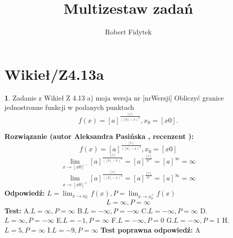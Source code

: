 \documentclass[12pt, a4paper]{article}
\title{Multizestaw zadań}
\author{Robert Fidytek}
\date{}
\theoremstyle{definition} %
\newtheorem{zad}{}
\newcommand{\kategoria}[1]{\section{#1}} %
\newcommand{\zadStart}[1]{\begin{zad}#1\newline} %
\newcommand{\zadStop}{\end{zad}}   %
\newcommand{\rozwStart}[2]{\noindent \textbf{Rozwiązanie (autor #1 , recenzent #2): }\newline} %
\newcommand{\rozwStop}{\newline}                                            %
\newcommand{\odpStart}{\noindent \textbf{Odpowiedź:}\newline}    %
\newcommand{\odpStop}{\newline}                                             %
\newcommand{\testStart}{\noindent \textbf{Test:}\newline} %
\newcommand{\testStop}{\newline} %
\newcommand{\kluczStart}{\noindent \textbf{Test poprawna odpowiedź:}\newline} %
\newcommand{\kluczStop}{\newline} %
\begin{document}
\maketitle


\kategoria{Wikieł/Z4.13a}
\zadStart{Zadanie z Wikieł Z 4.13 a) moja wersja nr [nrWersji]}
Obliczyć granice jednostronne funkcji w podanych punktach $$f(x)=[a]^{\frac{[c]}{([b]-x)^2}},x_{0}=[x0].$$
\zadStop
\rozwStart{Aleksandra Pasińska}{}
$$f(x)=[a]^{\frac{[c]}{([b]-x)^2}},x_{0}=[x0]$$
$$\lim_{x\rightarrow [x0]^-}[a]^{\frac{[c]}{([b]-x)^2}}=[a]^{\frac{[c]}{0^+}}=[a]^{\infty}=\infty$$ 
$$\lim_{x\rightarrow [x0]^+}[a]^{\frac{[c]}{([b]-x)^2}}=[a]^{\frac{[c]}{0^+}}=[a]^{\infty}=\infty$$ 
\rozwStop
\odpStart
$ L=\lim_{x\rightarrow x_{0}^-}f(x), P=\lim_{x\rightarrow x_{0}^+}f(x)$
$$L=\infty, P=\infty$$
\odpStop
\testStart
A.$ L=\infty, P=\infty $
B.$L=-\infty, P=-\infty$
C.$L=-\infty, P=\infty$
D.$L=\infty, P=-\infty$
E.$L=-1, P=\infty$
F.$L=-\infty, P=0$
G.$L=-\infty, P=1$
H.$L=5, P=\infty$
I.$L=-9, P=\infty$
\testStop
\kluczStart
A
\kluczStop
\end{document}
